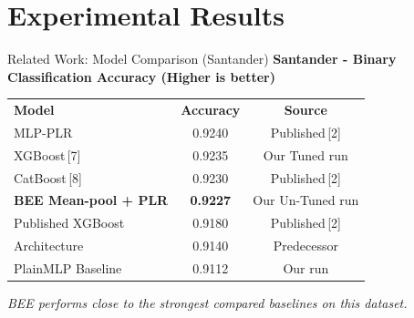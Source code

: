 \documentclass[aspectratio=169, xcolor=table]{beamer}
\begin{document}
\section{Experimental Results}

\begin{frame}{Related Work: Model Comparison (Santander)}
    \textbf{Santander - Binary Classification Accuracy (Higher is better)}
    \vspace{0.2cm}
    \begin{table}
        \centering
        \renewcommand{\arraystretch}{1.3}
        \begin{tabular}{l | c | c}
            \rowcolor{PrimaryColor} \color{white}\textbf{Model} & \color{white}\textbf{Accuracy} & \color{white}\textbf{Source} \\
            MLP-PLR & 0.9240 & Published\,{\scriptsize[2]} \\
            \rowcolor{LightGrey} XGBoost\,{\scriptsize[7]} & 0.9235 & Our Tuned run \\
            CatBoost\,{\scriptsize[8]} & 0.9230 & Published\,{\scriptsize[2]} \\
            \rowcolor{SecondaryColor} \color{white}\textbf{BEE Mean-pool + PLR} & \color{white}\textbf{0.9227} & \color{white}Our Un-Tuned run \\
            Published XGBoost & 0.9180 & Published\,{\scriptsize[2]} \\
            \rowcolor{LightGrey} Architecture & 0.9140 & Predecessor \\
            PlainMLP Baseline & 0.9112 & Our run \\
        \end{tabular}
    \end{table}
    \vspace{0.2cm}
    \textit{BEE performs close to the strongest compared baselines on this dataset.}
\end{frame}
\end{document}

